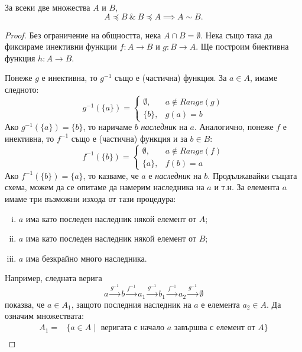 \begin{framed}
\begin{thm}
  \label{th:ksb}
  За всеки две множества $A$ и $B$,
  \[A \preceq B\ \&\ B \preceq A \implies A \sim B.\]
\end{thm}
\end{framed}
\begin{proof}
  Без ограничение на общността, нека $A\cap B = \emptyset$.
  Нека също така да фиксираме инективни функции $f:A\rightarrow B$ и $g:B\rightarrow A$.
  Ще построим биективна функция $h:A\rightarrow B$.
  
  Понеже $g$ е инективна, то $g^{-1}$ също е (частична) функция. За $a\in A$, имаме следното:
  \[
  g^{-1}(\{a\}) = 
  \begin{cases}
    \emptyset, & a \not\in Range(g)\\
    \{b\}, & g(a) = b 
  \end{cases}
  \]
  Ако $g^{-1}(\{a\}) = \{b\}$, то наричаме $b$ {\em наследник} на $a$.
  Аналогично, понеже $f$ е инективна, то $f^{-1}$ също е (частична) функция и за $b\in B$:
  \[
  f^{-1}(\{b\}) = 
  \begin{cases}
    \emptyset, & a \not\in Range(f)\\
    \{a\}, & f(b) = a 
  \end{cases}
  \]
  Ако $f^{-1}(\{b\}) = \{a\}$, то казваме, че $a$ е {\em наследник} на $b$.
  Продължавайки същата схема, можем да се опитаме да намерим наследника на $a$ и т.н.
  За елемента $a$ имаме три възможни изхода от тази процедура:
  \begin{enumerate}[i)]
  \item
    $a$ има като последен наследник някой елемент от $A$;
  \item
    $a$ има като последен наследник някой елемент от $B$;
  \item
    $a$ има безкрайно много наследника.
\end{enumerate}
Например, следната верига
\[a \stackrel{g^{-1}}{\longrightarrow} b \stackrel{f^{-1}}{\longrightarrow}a_1 \stackrel{g^{-1}}{\longrightarrow} b_1 \stackrel{f^{-1}}{\longrightarrow}a_2\stackrel{g^{-1}}{\longrightarrow}\emptyset\]
показва, че $a \in A_1$, защото последния наследник на $a$ е елемента $a_2 \in A$.
Да означим множествата:
\begin{align*}
  A_1 = & \{a\in A \mid \mbox{ веригата с начало $a$ завършва с елемент от } A\}\\

\end{align*}
\end{proof}
